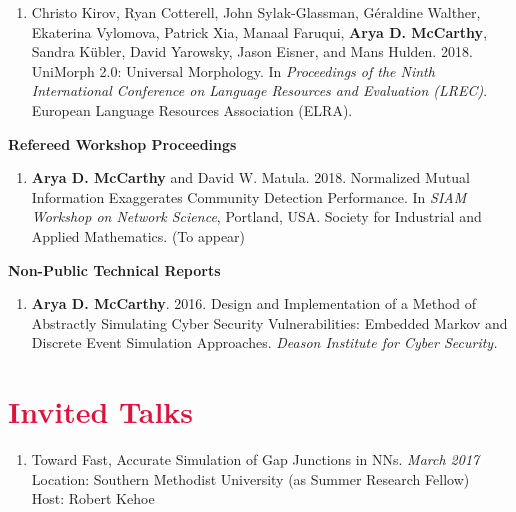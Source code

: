 \documentclass[margin, 10pt]{res} %
\newcommand{\Year}[1]{\emph{#1}}
\let\oldsection\section
\renewcommand{\section}[1]{\oldsection{\textcolor{crimson}{#1}}}
\begin{document}
\begin{resume}
\begin{enumerate}
\item Christo Kirov, Ryan Cotterell, John Sylak-Glassman, G\'eraldine Walther, Ekaterina Vylomova, Patrick Xia, Manaal Faruqui, \textbf{Arya D. McCarthy}, Sandra K{\"u}bler, David Yarowsky, Jason Eisner, and Mans Hulden. 2018. {UniMorph 2.0: Universal Morphology}. In \emph{Proceedings of the Ninth International Conference on Language Resources and Evaluation (LREC)}. European Language Resources Association (ELRA).
\end{enumerate}

\textbf{Refereed Workshop Proceedings}
\begin{enumerate}[resume]
\item \textbf{Arya D. McCarthy} and David W. Matula. 2018. Normalized Mutual Information Exaggerates Community Detection Performance. In \emph{SIAM Workshop on Network Science}, Portland, USA. Society for Industrial and Applied Mathematics. (To appear)
\end{enumerate}

\begin{samepage}
\textbf{Non-Public Technical Reports}
\begin{enumerate}[resume]
\item \textbf{Arya D. McCarthy}. 2016. Design and Implementation of a Method of Abstractly Simulating Cyber Security Vulnerabilities: Embedded Markov and Discrete Event Simulation Approaches. \emph{Deason Institute for Cyber Security.}
\end{enumerate}
\end{samepage}


\section{Invited Talks}
\begin{enumerate}
\item Toward Fast, Accurate Simulation of Gap Junctions in NNs. \hfill \Year{March 2017}\\
Location: Southern Methodist University (as Summer Research Fellow)\\
Host: Robert Kehoe
\end{enumerate}



\end{resume}
\end{document}
